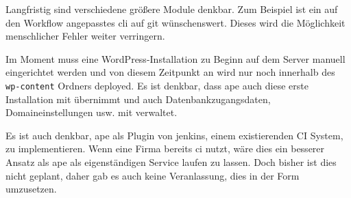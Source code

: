 Langfristig sind verschiedene größere Module denkbar. Zum Beispiel ist ein auf den Workflow angepasstes \gls{cli} auf \gls{git} wünschenswert. Dieses wird die Möglichkeit menschlicher Fehler weiter verringern.

Im Moment muss eine WordPress-Installation zu Beginn auf dem Server manuell eingerichtet werden und von diesem Zeitpunkt an wird nur noch innerhalb des \lstinline!wp-content! Ordners deployed. Es ist denkbar, dass \gls{ape} auch diese erste Installation mit übernimmt und auch Datenbankzugangsdaten, Domaineinstellungen usw. mit verwaltet.

Es ist auch denkbar, \gls{ape} als Plugin von \gls{jenkins}, einem existierenden \gls{CI} System, zu implementieren. Wenn eine Firma bereits \gls{ci} nutzt, wäre dies ein besserer Ansatz als \gls{ape} als eigenständigen Service laufen zu lassen. Doch bisher ist dies nicht geplant, daher gab es auch keine Veranlassung, dies in der Form umzusetzen.
